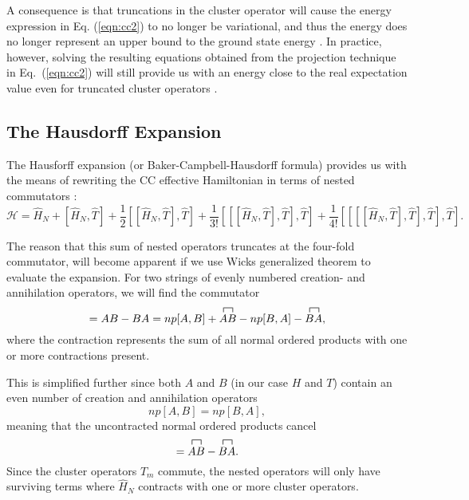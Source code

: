 A consequence is that truncations in the cluster operator will cause
the energy expression in Eq. (\ref{eqn:cc2}) to no longer be
variational, and thus the energy does no longer represent an upper
bound to the ground state energy \cite{CrawfordSchaefer}. In practice,
however, solving the resulting equations obtained from the
projection technique in Eq.~(\ref{eqn:cc2}) will still provide us
with an energy close to the real expectation value even for truncated
cluster operators \cite{CrawfordSchaefer}.

\subsection{The Hausdorff Expansion}

The Hausforff expansion (or Baker-Campbell-Hausdorff formula) provides
us with the means of rewriting the CC effective Hamiltonian in terms
of nested commutators \cite[p.293]{ShavittBartlett2009}:
\begin{equation}
\mathcal{H} = \hat{H}_N + [\hat{H}_N, \hat{T}] + \frac{1}{2} [[\hat{H}_N, \hat{T}], \hat{T}] +  \frac{1}{3!} [[[\hat{H}_N, \hat{T}], \hat{T}], \hat{T}] + \frac{1}{4!} [[[[\hat{H}_N, \hat{T}], \hat{T}], \hat{T}], \hat{T}].
\end{equation}

The reason that this sum of nested operators truncates at the
four-fold commutator, will become apparent if we use Wicks generalized
theorem to evaluate the expansion. For two strings of evenly numbered
creation- and annihilation operators, we will find the commutator
\begin{equation}
[A,B] = AB - BA = np[A,B] + 
\contraction{}{A}{}{B}
AB - np[B,A] - 
\contraction{}{B}{}{A}
BA,
\end{equation}
where the contraction represents the sum of all normal ordered products with one or more contractions present. 

This is simplified further since both $A$ and $B$ (in our case $H$ and
$T$) contain an even number of creation and annihilation operators
\begin{equation}
np[A,B] = np[B,A],
\end{equation}
meaning that  the uncontracted normal ordered products cancel
\begin{equation}
[A,B] =  
\contraction{}{A}{}{B}
AB - 
\contraction{}{B}{}{A}
BA.
\end{equation}
Since the cluster operators $T_m$ commute, the nested operators will
only have surviving terms where $\hat{H}_N$ contracts with one or more
cluster operators.

